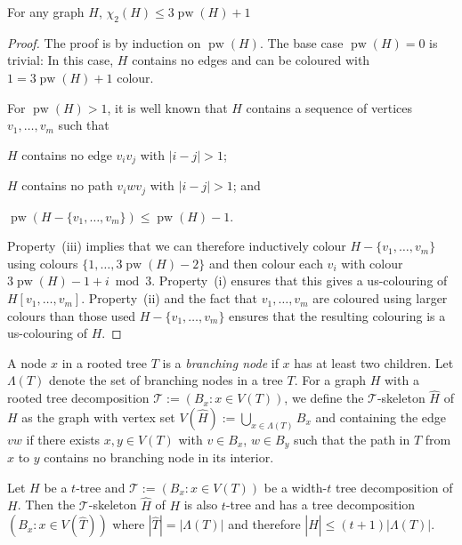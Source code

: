 \documentclass[kpfonts]{patmorin}
\DeclareMathOperator{\pw}{pw}
\newcommand{\uqs}{\chi_2}
\theoremstyle{named}
\begin{document}
\begin{lem}\label{pathwidth}
    For any graph $H$, $\uqs(H)\le 3\pw(H) + 1$
\end{lem}

\begin{proof}
    The proof is by induction on $\pw(H)$.  The base case $\pw(H)=0$ is trivial: In this case, $H$ contains no edges and can be coloured with $1 = 3\pw(H)+1$ colour.

    For $\pw(H)>1$, it is well known that $H$ contains a sequence of vertices $v_1,\ldots,v_m$  such that
    \begin{inparaenum}[(i)]
        \item $H$ contains no edge $v_iv_j$ with $|i-j|>1$;
        \item $H$ contains no path $v_iw v_j$ with $|i-j|>1$; and
        \item $\pw(H-\{v_1,\ldots,v_m\})\le \pw(H)-1$.
    \end{inparaenum}
    Property~(iii) implies that we can therefore inductively colour $H-\{v_1,\ldots,v_m\}$ using colours $\{1,\ldots,3\pw(H)-2\}$ and then colour each $v_i$ with colour $3\pw(H)-1+i\bmod 3$.  Property~(i) ensures that this gives a us-colouring of $H[v_1,\ldots,v_m]$.  Property~(ii) and the fact that $v_1,\ldots,v_m$ are coloured using larger colours than those used $H-\{v_1,\ldots,v_m\}$ ensures that the resulting colouring is a us-colouring of $H$.
\end{proof}

A node $x$ in a rooted tree $T$ is a \emph{branching node} if $x$ has at least two children.  Let $\Lambda(T)$ denote the set of branching nodes in a tree $T$. For a graph $H$ with a rooted tree decomposition $\mathcal{T}:=(B_x:x\in V(T))$, we define the $\mathcal{T}$-skeleton $\hat{H}$ of $H$ as the graph with vertex set $V(\hat{H}):=\bigcup_{x\in \Lambda(T)} B_x$ and containing the edge $vw$ if there exists $x,y\in V(T)$ with $v\in B_x$, $w\in B_y$ such that the path in $T$ from $x$ to $y$ contains no branching node in its interior.

\begin{obs}\label{skeleton-size}
    Let $H$ be a $t$-tree and $\mathcal{T}:=(B_x:x\in V(T))$ be a width-$t$ tree decomposition of $H$.  Then the $\mathcal{T}$-skeleton $\hat{H}$ of $H$ is also $t$-tree and has a tree decomposition $(B_x:x\in V(\hat{T}))$ where $|\hat{T}|=|\Lambda(T)|$ and therefore $|\hat{H}|\le (t+1)|\Lambda(T)|$.
\end{obs}
\end{document}
